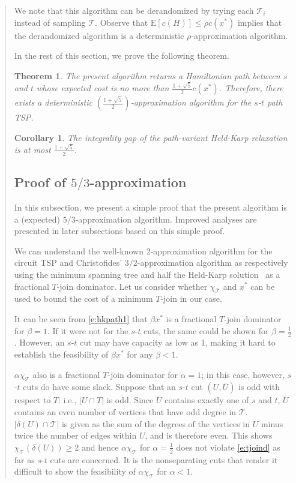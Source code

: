 \documentclass[11pt,letterpaper]{article}
\newtheorem{thm}{Theorem}
\newtheorem{cor}{Corollary}
\newcommand{\E}{\mathrm{E}}
\newcommand{\st}{\mbox{$s$-$t$} }
\begin{document}
\begin{quote}
We note that this algorithm can be derandomized by trying each $\mathscr{T}_i$ instead of sampling $\mathscr{T}$. Observe that $\E[c(H)]\leq\rho c(x^*)$ implies that the derandomized algorithm is a deterministic $\rho$-approximation algorithm.

In the rest of this section, we prove the following theorem.

\begin{thm}\label{t:main}
The present algorithm returns a Hamiltonian path between $s$ and $t$ whose expected cost is no more than $\frac{1+\sqrt{5}}{2}c(x^*)$. Therefore, there exists a deterministic $\left(\frac{1+\sqrt{5}}{2}\right)$-approximation algorithm for the \st path TSP.
\end{thm}

\begin{cor}\label{c:ig}
The integrality gap of the path-variant Held-Karp relaxation is at most $\frac{1+\sqrt{5}}{2}$.
\end{cor}

\subsection{Proof of $5/3$-approximation}

In this subsection, we present a simple proof that the present algorithm is a (expected) $5/3$-approximation algorithm. Improved analyses are presented in later subsections based on this simple proof.

We can understand the well-known $2$-approximation algorithm for the circuit TSP and Christofides' $3/2$-approximation algorithm as respectively using the minimum spanning tree and half the Held-Karp solution~\cite{W, SW} as a fractional $T$-join dominator. Let us consider whether $\chi_{\mathscr{T}}$ and $x^*$ can be used to bound the cost of a minimum $T$-join in our case.

It can be seen from \eqref{e:hkpath1} that $\beta x^*$ is a fractional $T$-join dominator for $\beta=1$. If it were not for the \st cuts, the same could be shown for $\beta=\frac{1}{2}$. However, an \st cut may have capacity as low as 1, making it hard to establish the feasibility of $\beta x^*$ for any $\beta<1$.

$\alpha \chi_{\mathscr{T}}$ also is a fractional $T$-join dominator for $\alpha=1$; in this case, however, \st cuts do have some slack. Suppose that an \st cut $(U,\bar U)$ is odd with respect to $T$: i.e., $|U\cap T|$ is odd. Since $U$ contains exactly one of $s$ and $t$, $U$ contains an even number of vertices that have odd degree in $\mathscr{T}$. $|\delta(U)\cap \mathscr{T}|$ is given as the sum of the degrees of the vertices in $U$ minus twice the number of edges within $U$, and is therefore even. This shows $\chi_{\mathscr{T}}(\delta(U))\geq 2$ and hence $\alpha \chi_{\mathscr{T}}$ for $\alpha=\frac{1}{2}$ does not violate \eqref{e:tjoind} as far as \st cuts are concerned. It is the nonseparating cuts that render it difficult to show the feasibility of $\alpha \chi_{\mathscr{T}}$ for $\alpha<1$.


\end{quote}
\end{document}
